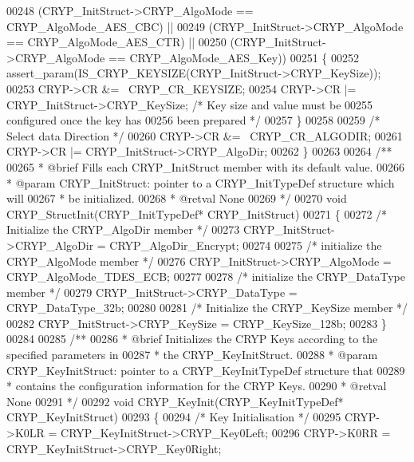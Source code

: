 \begin{DoxyCode}
00248       (CRYP\_InitStruct->CRYP_AlgoMode == CRYP_AlgoMode_AES_CBC) ||
00249       (CRYP\_InitStruct->CRYP_AlgoMode == CRYP_AlgoMode_AES_CTR) ||
00250       (CRYP\_InitStruct->CRYP_AlgoMode == CRYP_AlgoMode_AES_Key))
00251   \{
00252     assert_param(IS\_CRYP\_KEYSIZE(CRYP\_InitStruct->CRYP\_KeySize));
00253     CRYP->CR &= ~CRYP_CR_KEYSIZE;
00254     CRYP->CR |= CRYP\_InitStruct->CRYP\_KeySize; \textcolor{comment}{/* Key size and value must be }
00255 \textcolor{comment}{                                                  configured once the key has }
00256 \textcolor{comment}{                                                  been prepared */}
00257   \}
00258 
00259   \textcolor{comment}{/* Select data Direction */}
00260   CRYP->CR &= ~CRYP_CR_ALGODIR;
00261   CRYP->CR |= CRYP\_InitStruct->CRYP\_AlgoDir;
00262 \}
00263 
00264 \textcolor{comment}{/**}
00265 \textcolor{comment}{  * @brief  Fills each CRYP\_InitStruct member with its default value.}
00266 \textcolor{comment}{  * @param  CRYP\_InitStruct: pointer to a CRYP\_InitTypeDef structure which will}
00267 \textcolor{comment}{  *         be initialized.}
00268 \textcolor{comment}{  * @retval None}
00269 \textcolor{comment}{  */}
00270 \textcolor{keywordtype}{void} CRYP_StructInit(CRYP\_InitTypeDef* CRYP\_InitStruct)
00271 \{
00272   \textcolor{comment}{/* Initialize the CRYP\_AlgoDir member */}
00273   CRYP\_InitStruct->CRYP_AlgoDir = CRYP_AlgoDir_Encrypt;
00274 
00275   \textcolor{comment}{/* initialize the CRYP\_AlgoMode member */}
00276   CRYP\_InitStruct->CRYP_AlgoMode = CRYP_AlgoMode_TDES_ECB;
00277 
00278   \textcolor{comment}{/* initialize the CRYP\_DataType member */}
00279   CRYP\_InitStruct->CRYP_DataType = CRYP_DataType_32b;
00280 
00281   \textcolor{comment}{/* Initialize the CRYP\_KeySize member */}
00282   CRYP\_InitStruct->CRYP_KeySize = CRYP_KeySize_128b;
00283 \}
00284 
00285 \textcolor{comment}{/**}
00286 \textcolor{comment}{  * @brief  Initializes the CRYP Keys according to the specified parameters in}
00287 \textcolor{comment}{  *         the CRYP\_KeyInitStruct.}
00288 \textcolor{comment}{  * @param  CRYP\_KeyInitStruct: pointer to a CRYP\_KeyInitTypeDef structure that}
00289 \textcolor{comment}{  *         contains the configuration information for the CRYP Keys.}
00290 \textcolor{comment}{  * @retval None}
00291 \textcolor{comment}{  */}
00292 \textcolor{keywordtype}{void} CRYP_KeyInit(CRYP\_KeyInitTypeDef* CRYP\_KeyInitStruct)
00293 \{
00294   \textcolor{comment}{/* Key Initialisation */}
00295   CRYP->K0LR = CRYP\_KeyInitStruct->CRYP\_Key0Left;
00296   CRYP->K0RR = CRYP\_KeyInitStruct->CRYP\_Key0Right;

\end{DoxyCode}
